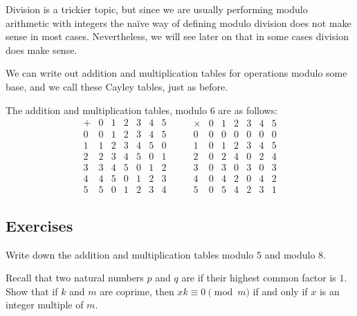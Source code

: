Division is a trickier topic, but since we are usually performing modulo
arithmetic with integers the na\"{i}ve way of defining modulo division does
not make sense in most cases.  Nevertheless, we will see later on that in
some cases division does make sense.

We can write out addition and multiplication tables for operations modulo
some base, and we call these Cayley tables, just as before.

\begin{example}\label{eg:mod6}
  The addition and multiplication tables, modulo 6 are as follows:
  \[
    \begin{array}{c|cccccc}
      + & 0 & 1 & 2 & 3 & 4 & 5 \\
      \hline
      0 & 0 & 1 & 2 & 3 & 4 & 5 \\
      1 & 1 & 2 & 3 & 4 & 5 & 0 \\
      2 & 2 & 3 & 4 & 5 & 0 & 1 \\
      3 & 3 & 4 & 5 & 0 & 1 & 2 \\
      4 & 4 & 5 & 0 & 1 & 2 & 3 \\
      5 & 5 & 0 & 1 & 2 & 3 & 4
    \end{array}
  \qquad
    \begin{array}{c|cccccc}
      \times & 0 & 1 & 2 & 3 & 4 & 5 \\
      \hline
      0 & 0 & 0 & 0 & 0 & 0 & 0 \\
      1 & 0 & 1 & 2 & 3 & 4 & 5 \\
      2 & 0 & 2 & 4 & 0 & 2 & 4 \\
      3 & 0 & 3 & 0 & 3 & 0 & 3 \\
      4 & 0 & 4 & 2 & 0 & 4 & 2 \\
      5 & 0 & 5 & 4 & 2 & 3 & 1
    \end{array}
  \]
\end{example}

\subsection*{Exercises}

\begin{exercises}
  \item Write down the addition and multiplication tables modulo 5 and modulo 8.

  \item\label{ex:zerodivisor} Recall that two natural numbers $p$ and $q$ are  if their
    highest common factor is $1$.  Show that if $k$ and $m$ are coprime, then
    $xk \equiv 0 \pmod{m}$ if and only if $x$ is an integer multiple of $m$.
\end{exercises}

